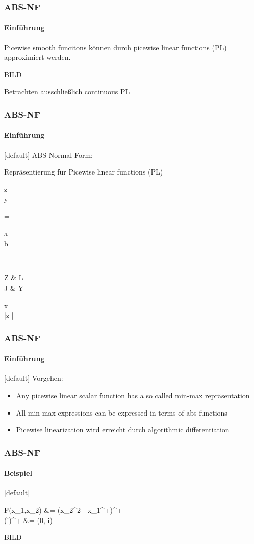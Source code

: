 \begin{frame}
\frametitle{ABS-NF}
\framesubtitle{Einführung}
	Picewise smooth  funcitons können durch picewise linear functions (PL) approximiert werden.
	\begin{center}
		BILD
	\end{center}
	Betrachten ausschließlich continuous PL
\end{frame}
\begin{frame}
	\frametitle{ABS-NF}
	\framesubtitle{Einführung}
	[default]
	ABS-Normal Form:
	\begin{center}
		Repräsentierung für Picewise linear functions (PL) 
	\end{center}
	\begin{flalign*}
	\begin{pmatrix}
	\Delta z \\
	\Delta y
	\end{pmatrix}
	= 
	\begin{pmatrix}
	a \\
	b
	\end{pmatrix}
	+
	\begin{pmatrix}
	Z & L \\
	J & Y 
	\end{pmatrix}
	\times
	\begin{pmatrix}
	\Delta x \\
	|\Delta z |
	\end{pmatrix}
	\end{flalign*}
\end{frame}
\begin{frame}
	\frametitle{ABS-NF}
	\framesubtitle{Einführung}
	[default]
	Vorgehen:
	\begin{itemize}
		\item Any picewise linear scalar function has a so called min-max repräsentation
		\item All min max expressions can be expressed in terms of abs functions
		\item Picewise linearization wird erreicht durch algorithmic differentiation
	\end{itemize}
\end{frame}
\begin{frame}
	\frametitle{ABS-NF}
	\framesubtitle{Beispiel}
	[default]
	\begin{flalign*}
		F(x_1,x_2) &= (x_2^2 - x_1^+)^+ \\
			 (i)^+ &= \max(0, i)
	\end{flalign*}
	\begin{center}
		BILD
	\end{center}
	
\end{frame}
